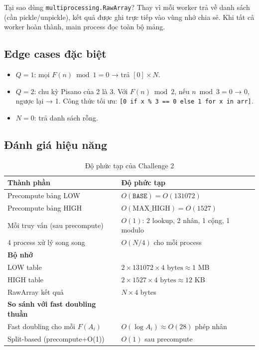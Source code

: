 \documentclass[12pt,a4paper]{article}
\begin{document}
Tại sao dùng \texttt{multiprocessing.RawArray}? Thay vì mỗi worker trả về danh sách (cần pickle/unpickle), kết quả được ghi trực tiếp vào vùng nhớ chia sẻ. Khi tất cả worker hoàn thành, main process đọc toàn bộ mảng.

\subsection{Edge cases đặc biệt}

\begin{itemize}
  \item \textbf{$Q = 1$}: mọi $F(n) \bmod 1 = 0$ → trả $[0] \times N$.
  \item \textbf{$Q = 2$}: chu kỳ Pisano của 2 là 3. Với $F(n) \bmod 2$, nếu $n \bmod 3 = 0$ → 0, ngược lại → 1. Công thức tối ưu: \texttt{[0 if x \% 3 == 0 else 1 for x in arr]}.
  \item \textbf{$N = 0$}: trả danh sách rỗng.
\end{itemize}

\subsection{Đánh giá hiệu năng}

\begin{table}[H]
\centering
\caption{Độ phức tạp của Challenge 2}
\begin{tabularx}{\textwidth}{p{4.5cm}Y}
\toprule
\textbf{Thành phần} & \textbf{Độ phức tạp} \\
\midrule
Precompute bảng LOW & $O(\texttt{BASE}) = O(131072)$ \\
Precompute bảng HIGH & $O(\text{MAX\_HIGH}) = O(1527)$ \\
Mỗi truy vấn (sau precompute) & $O(1)$: 2 lookup, 2 nhân, 1 cộng, 1 modulo \\
4 process xử lý song song & $O(N/4)$ cho mỗi process \\
\midrule
\textbf{Bộ nhớ} & \\
LOW table & $2 \times 131072 \times 4\text{ bytes} \approx 1$ MB \\
HIGH table & $2 \times 1527 \times 4\text{ bytes} \approx 12$ KB \\
RawArray kết quả & $N \times 4$ bytes \\
\midrule
\textbf{So sánh với fast doubling thuần} & \\
Fast doubling cho mỗi $F(A_i)$ & $O(\log A_i) \approx O(28)$ phép nhân \\
Split-based (precompute+O(1)) & $O(1)$ sau precompute \\
\bottomrule
\end{tabularx}
\end{table}
\end{document}
